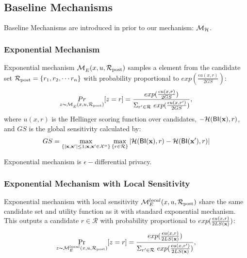 \documentclass{article}
\begin{document}
\subsection{Baseline Mechanisms}
\label{subsec_baselines}
Baseline Mechanisms are introduced in prior to our mechanism: $\mathcal{M}_{\mathcal{H}}$.

\subsubsection{Exponential Mechanism}
Exponential mechanism $\mathcal{M}_E^{}({x},{u},{\mathcal{R}_{\textup{post}}})$ samples a element from the candidate set $\mathcal{R}_{\textup{post}} = \{r_1, r_2, \cdots r_n\}$ with probability proportional to $exp(\frac{\epsilon u(x,r)}{2 GS})$:
\begin{equation*}
\underset{z \thicksim \mathcal{M}_E^{}({x},{u},{\mathcal{R}_{\textup{post}}}) }{Pr}[z=r] = \frac
{exp(\frac{\epsilon u(x,r)}{2 GS})}
{\Sigma_{r' \in \mathcal{R}}\ exp(\frac{\epsilon u(x,r')}{2 GS})},
\end{equation*}
where $u(x,r)$ is the Hellinger scoring function over candidates, $-\mathcal{H}(\mathsf{BI}(\textbf{x}), r)$, and $GS$ is the global sensitivity calculated by:
\begin{equation*}
GS = 
\max_{\{|\textbf{x},\textbf{x}'| \leq 1;\textbf{x},\textbf{x}'\in \mathcal{X}^n\}}\max_{\{r\in \mathcal{R}\}}
|\mathcal{H}(\mathsf{BI}(\textbf{x}), r) - \mathcal{H}(\mathsf{BI}(\textbf{x}'), r)|
\end{equation*}

Exponential mechanism is $\epsilon -$differential privacy\cite{dwork2014algorithmic}.


\subsubsection{Exponential Mechanism with Local Sensitivity}
\label{subsec_emls}
Exponential mechanism with local sensitivity $\mathcal{M}_E^{local}({x},{u},{\mathcal{R}_{\textup{post}}})$ share the same candidate set and utility function as it with standard exponential mechanism. This outputs a candidate $r \in \mathcal{R}$ with probability proportional to $exp(\frac{\epsilon u(x,r)}{2 LS(\textbf{x})})$:
\begin{equation*}
\underset{z \thicksim \mathcal{M}_E^{local}({x},{u},{\mathcal{R}_{\textup{post}}})}{\Pr}[z=r] = \frac
{exp(\frac{\epsilon u(x,r)}{2 LS(\textbf{x})})}
{\Sigma_{r' \in \mathcal{R}}\ exp(\frac{\epsilon u(x,r')}{2 LS(\textbf{x})})},
\end{equation*}
\end{document}
